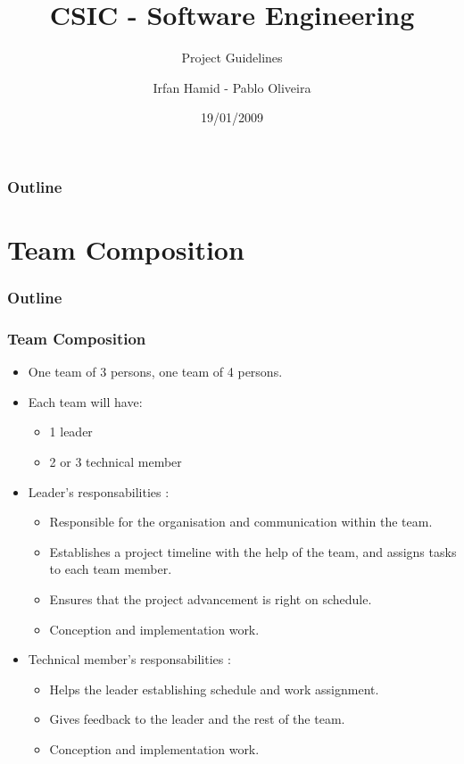 \documentclass[10pt]{beamer}
\title{CSIC - Software Engineering}
\subtitle{Project Guidelines}
\author{Irfan Hamid - Pablo Oliveira}
\institute{ENST}
\date{19/01/2009}
\begin{document}
\begin{frame}
  \titlepage
\end{frame}
\begin{frame}
  \frametitle{Outline}
  \tableofcontents[currentsection]
\end{frame}


\section{Team Composition}
\begin{frame}
  \frametitle{Outline}
  \tableofcontents[currentsection]
\end{frame}


\begin{frame}
  \frametitle{Team Composition}
  \begin{itemize}
  \item One team of 3 persons, one team of 4 persons.
  \item Each team will have:
    \begin{itemize}
    \item 1 leader
    \item 2 or 3 technical member
    \end{itemize}
  \item Leader's responsabilities :
    \begin{itemize}
      \item Responsible for the organisation and communication within the team.
      \item Establishes a project timeline with the help of the team, and assigns
        tasks to each team member.
      \item Ensures that the project advancement is right on schedule.
      \item Conception and implementation work.
    \end{itemize}
  \item Technical member's responsabilities :
    \begin{itemize}
    \item Helps the leader establishing schedule and work assignment.
    \item Gives feedback to the leader and the rest of the team.
    \item Conception and implementation work.
    \end{itemize}
  \end{itemize}
\end{frame}
\end{document}
